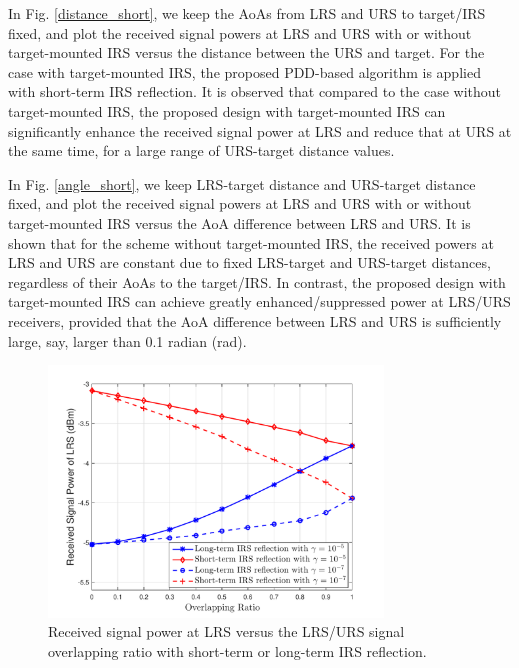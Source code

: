 \documentclass[10pt,final,doublecolumn]{IEEEtran}
\begin{document}
In Fig. \ref{distance_short}, we keep the AoAs from LRS and URS to target/IRS fixed, and plot the received signal powers at LRS and URS with or without target-mounted IRS versus the distance between the URS and target. For the case with target-mounted IRS, the proposed PDD-based algorithm is applied with short-term IRS reflection. It is observed that compared to the case without target-mounted IRS, the proposed design with target-mounted IRS can significantly enhance the received signal power at LRS and reduce that at URS at the same time, for a large range of URS-target distance values.

In Fig. \ref{angle_short}, we keep LRS-target distance and URS-target distance fixed, and plot the received signal powers at LRS and URS with or without target-mounted IRS versus the AoA difference between LRS and URS. It is shown that for the scheme without target-mounted IRS, the received powers at LRS and URS are constant due to fixed LRS-target and URS-target distances, regardless of their AoAs to the target/IRS. In contrast, the proposed design with target-mounted IRS can achieve greatly enhanced/suppressed power at LRS/URS receivers, provided that the AoA difference between LRS and URS is sufficiently large, say, larger than 0.1 radian (rad).
\begin{figure}[t]
\centering
\setlength{\abovecaptionskip}{0.cm}
\includegraphics[width=3.5in]{overlapped_ratio.pdf}
\caption{Received signal power at LRS versus the LRS/URS signal overlapping  ratio with short-term or long-term IRS reflection.}
\label{overlapped_ratio}
\end{figure}
\end{document}
